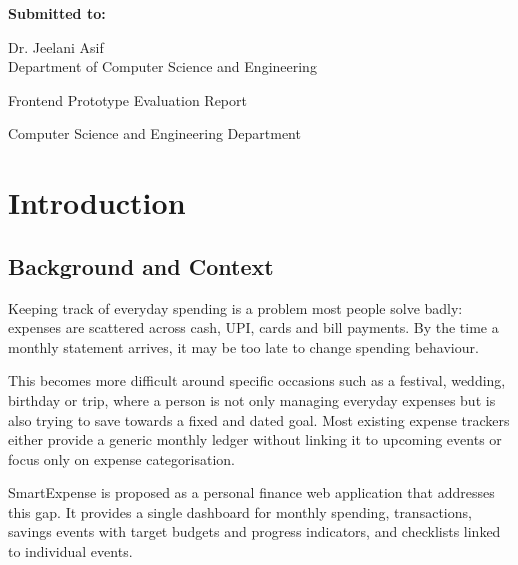 \documentclass[12pt,a4paper]{report}
\begin{document}
\begin{titlepage}
\begin{center}
\textbf{Submitted to:}

\vspace{0.15cm}

Dr. Jeelani Asif\\
Department of Computer Science and Engineering

\vspace{1.2cm}

{\normalsize Frontend Prototype Evaluation Report\par}

\vspace{0.1cm}

{\normalsize Computer Science and Engineering Department\par}

\end{center}

\end{titlepage}

\clearpage

\tableofcontents




\chapter{Introduction}

\section{Background and Context}

Keeping track of everyday spending is a problem most people solve badly:
expenses are scattered across cash, UPI, cards and bill payments. By the
time a monthly statement arrives, it may be too late to change spending
behaviour.

This becomes more difficult around specific occasions such as a festival,
wedding, birthday or trip, where a person is not only managing everyday
expenses but is also trying to save towards a fixed and dated goal.
Most existing expense trackers either provide a generic monthly ledger
without linking it to upcoming events or focus only on expense
categorisation.

SmartExpense is proposed as a personal finance web application that
addresses this gap. It provides a single dashboard for monthly spending,
transactions, savings events with target budgets and progress indicators,
and checklists linked to individual events.
\end{document}
